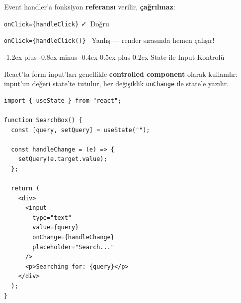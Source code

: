 \documentclass[12pt, a4paper]{article}
\makeatletter
\renewcommand{\subsection}{%
  \@startsection{subsection}{2}{\z@}%
    {-1.2ex plus -0.8ex minus -0.4ex}%
    {0.5ex plus 0.2ex}%
    {\normalfont\large\bfseries\sffamily\color{secondary}}%
}
\makeatother
\begin{document}
\vspace{6pt}

\begin{warningbox}
Event handler'a fonksiyon \textbf{referansı} verilir, \textbf{çağrılmaz}:

\vspace{4pt}
\texttt{onClick=\{handleClick\}} \quad\color{accent}\faCheck\ Doğru

\texttt{onClick=\{handleClick()\}} \quad\color{danger}\faTimes\ Yanlış --- render sırasında hemen çalışır!
\end{warningbox}

\subsection{State ile Input Kontrolü}

React'ta form input'ları genellikle \textbf{controlled component}
olarak kullanılır: input'un değeri state'te tutulur, her değişiklik
\texttt{onChange} ile state'e yazılır.

\vspace{6pt}

\begin{tcolorbox}[enhanced, colback=codebg, colframe=gray!30,
    colbacktitle=primary!85!black, coltitle=white, arc=4pt,
    title={\sffamily\bfseries\small Controlled Input}]
\begin{lstlisting}[style=jsxstyle]
import { useState } from "react";

function SearchBox() {
  const [query, setQuery] = useState("");

  const handleChange = (e) => {
    setQuery(e.target.value);
  };

  return (
    <div>
      <input
        type="text"
        value={query}
        onChange={handleChange}
        placeholder="Search..."
      />
      <p>Searching for: {query}</p>
    </div>
  );
}
\end{lstlisting}
\end{tcolorbox}

\vspace{8pt}
\end{document}
